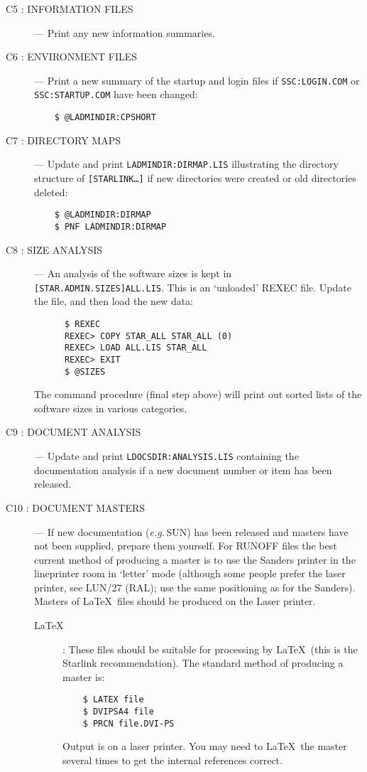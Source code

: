 \begin{description}
\item [C5 : INFORMATION FILES] ---
Print any new information summaries.

\item [C6 : ENVIRONMENT FILES] ---
Print a new summary of the startup and login files if {\tt SSC:\-LO\-GIN.\-COM}
or {\tt SSC:STARTUP.COM} have been changed:
\begin{verbatim}
    $ @LADMINDIR:CPSHORT
\end{verbatim}

\item [C7 : DIRECTORY MAPS] ---
Update and print {\tt LADMINDIR:DIRMAP.LIS} illustrating the directory
structure of {\tt [STARLINK\ldots]} if new directories were created or old
directories deleted:
\begin{verbatim}
    $ @LADMINDIR:DIRMAP
    $ PNF LADMINDIR:DIRMAP
\end{verbatim}

\item [C8 : SIZE ANALYSIS] ---
An analysis of the software sizes is kept in {\tt [STAR.ADMIN.SIZES]\-ALL.LIS}.
This is an `unloaded' REXEC file. Update the file, and then load the new data:
\begin{verbatim}
      $ REXEC
      REXEC> COPY STAR_ALL STAR_ALL (0)
      REXEC> LOAD ALL.LIS STAR_ALL
      REXEC> EXIT
      $ @SIZES
\end{verbatim}
The command procedure (final step above) will print out sorted lists of the
software sizes in various categories.

\item [C9 : DOCUMENT ANALYSIS] ---
Update and print {\tt LDOCSDIR:ANALYSIS.LIS} containing the documentation
analysis if a new document number or item has been released.

\item [C10 : DOCUMENT MASTERS] ---
If new documentation ({\em e.g.}\,SUN) has been released and masters have not
been supplied, prepare them yourself.
For RUNOFF files the best current method of producing a master is to use the
Sanders printer in the lineprinter room in `letter' mode (although some people
prefer the laser printer, see LUN/27 (RAL); use the same positioning as for the
Sanders).
Masters of \LaTeX\ files should be produced on the Laser printer.

\begin{description}

\item [\LaTeX] :
These files should be suitable for processing by \LaTeX\ (this is the Starlink
recommendation).
The standard method of producing a master is:
\begin{verbatim}
    $ LATEX file
    $ DVIPSA4 file
    $ PRCN file.DVI-PS
\end{verbatim}
Output is on a laser printer. You may need to \LaTeX\ the master several times
to get the internal references correct.


\end{description}
\end{description}
